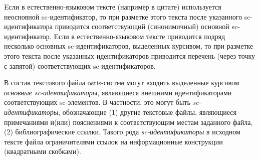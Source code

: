 \begin{SCn}
    Eсли в естественно-языковом тексте (например в цитате) используется неосновной sc-идентификатор, то при разметке этого текста после указанного sc-идентификатора приводится соответствующий (синонимичный) основной sc-идентификатор.
    Eсли в естественно-языковом тексте приводится подряд несколько основных sc-идентификаторов, выделенных курсивом, то при разметке этого текста после указанных идентификаторов приводится перечень (через точку с запятой) соответствующих sc-идентификаторов.

    В состав текстового файла ostis-систем могут входить выделенные курсивом \textit{основные sc-идентификаторы}, являющиеся внешними идентификаторами соответствующих sc-элементов.
    В частности, это могут быть \textit{sc-идентификаторы}, обозначающие (1) другие текстовые файлы, являющиеся примечаниями и(или) пояснениями к соответствующим местам заданного файла, (2) библиографические ссылки.
    Такого рода \textit{sc-идентификаторы} в исходном тексте файла ограничителями ссылок на информационные конструкции (квадратными скобками).

        \begin{scnindent}
        \end{scnindent}

\end{SCn}

%